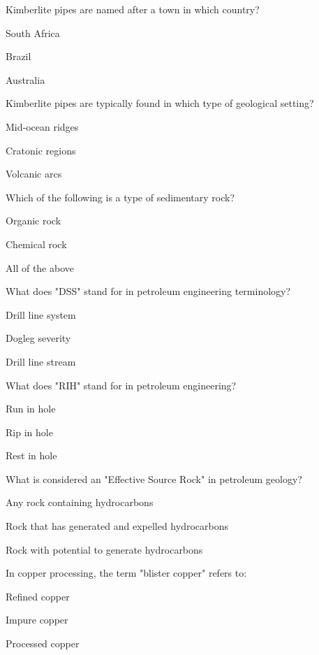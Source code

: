 \begin{enhancedmcq}{Kimberlite pipes are named after a town in which country?}
\item South Africa
\item Brazil
\item Australia

\end{enhancedmcq}
\begin{enhancedmcq}{Kimberlite pipes are typically found in which type of geological setting?}
\item Mid‑ocean ridges
\item Cratonic regions
\item Volcanic arcs

\end{enhancedmcq}
\begin{enhancedmcq}{Which of the following is a type of sedimentary rock?}
\item Organic rock
\item Chemical rock
\item All of the above

\end{enhancedmcq}
\begin{enhancedmcq}{What does "DSS" stand for in petroleum engineering terminology?}
\item Drill line system
\item Dogleg severity
\item Drill line stream

\end{enhancedmcq}
\begin{enhancedmcq}{What does "RIH" stand for in petroleum engineering?}
\item Run in hole
\item Rip in hole
\item Rest in hole

\end{enhancedmcq}
\begin{enhancedmcq}{What is considered an "Effective Source Rock" in petroleum geology?}
\item Any rock containing hydrocarbons
\item Rock that has generated and expelled hydrocarbons
\item Rock with potential to generate hydrocarbons

\end{enhancedmcq}
\begin{enhancedmcq}{In copper processing, the term "blister copper" refers to:}
\item Refined copper
\item Impure copper
\item Processed copper

\end{enhancedmcq}

